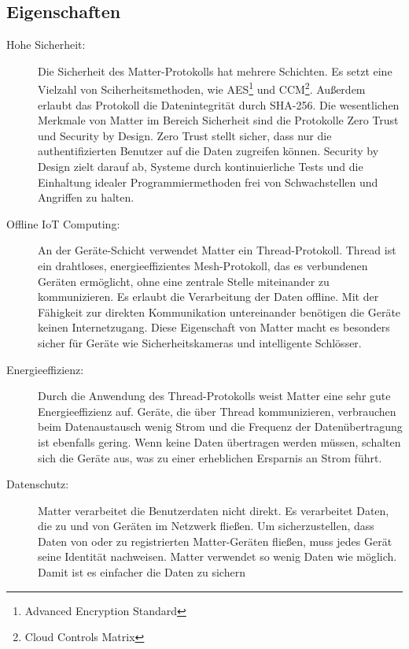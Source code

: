 \documentclass[12pt, a4paper]{article}
\begin{document}
\subsection{Eigenschaften}
\begin{description}
  \item [Hohe Sicherheit:] Die Sicherheit des Matter-Protokolls hat mehrere Schichten. Es setzt eine Vielzahl von Sciherheitsmethoden, wie AES\footnote[4]{Advanced Encryption Standard} und CCM\footnote[5]{Cloud Controls Matrix}. Außerdem erlaubt das Protokoll die Datenintegrität durch SHA-256. Die wesentlichen Merkmale von Matter im Bereich Sicherheit sind die Protokolle Zero Trust und Security by Design. Zero Trust stellt sicher, dass nur die authentifizierten Benutzer auf die Daten zugreifen können. Security by Design zielt darauf ab, Systeme durch kontinuierliche Tests und die Einhaltung idealer Programmiermethoden frei von Schwachstellen und Angriffen zu halten.
  \item [Offline IoT Computing:] An der Geräte-Schicht verwendet Matter ein Thread-Protokoll. Thread ist ein drahtloses, energieeffizientes Mesh-Protokoll, das es verbundenen Geräten ermöglicht, ohne eine zentrale Stelle miteinander zu kommunizieren. Es erlaubt die Verarbeitung der Daten offline. Mit der Fähigkeit zur direkten Kommunikation untereinander benötigen die Geräte keinen Internetzugang. Diese Eigenschaft von Matter macht es besonders sicher für Geräte wie Sicherheitskameras und intelligente Schlösser. 
  \item [Energieeffizienz:] Durch die Anwendung des Thread-Protokolls weist Matter eine sehr gute Energieeffizienz auf. Geräte, die über Thread kommunizieren, verbrauchen beim Datenaustausch wenig Strom und die Frequenz der Datenübertragung ist ebenfalls gering. Wenn keine Daten übertragen werden müssen, schalten sich die Geräte aus, was zu einer erheblichen Ersparnis an Strom führt.
  \item [Datenschutz:]Matter verarbeitet die Benutzerdaten nicht direkt. Es verarbeitet Daten, die zu und von Geräten im Netzwerk fließen. Um sicherzustellen, dass Daten von oder zu registrierten Matter-Geräten fließen, muss jedes Gerät seine Identität nachweisen. Matter verwendet so wenig Daten wie möglich. Damit ist es einfacher die Daten zu sichern 
\end{description}
\end{document}
